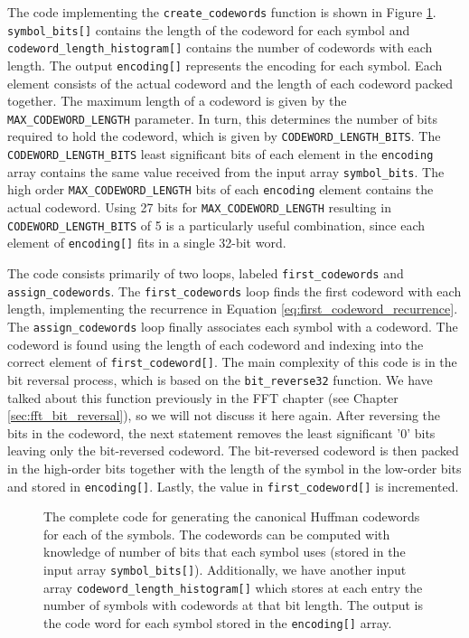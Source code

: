 The code implementing the \lstinline{create_codewords} function is shown in Figure \ref{fig:huffman_create_codeword.cpp}. \lstinline{symbol_bits[]} contains the length of the codeword for each symbol and \lstinline{codeword_length_histogram[]} contains the number of codewords with each length. The output \lstinline{encoding[]} represents the encoding for each symbol. Each element consists of the actual codeword and the length of each codeword packed together.  The maximum length of a codeword is given by the \lstinline{MAX_CODEWORD_LENGTH} parameter.  In turn, this determines the number of bits required to hold the codeword, which is given by  \lstinline{CODEWORD_LENGTH_BITS}. The \lstinline{CODEWORD_LENGTH_BITS} least significant bits of each element in the \lstinline{encoding} array contains the same value received from the input array \lstinline{symbol_bits}. The high order \lstinline{MAX_CODEWORD_LENGTH} bits of each \lstinline{encoding} element contains the actual codeword.  Using 27 bits for \lstinline{MAX_CODEWORD_LENGTH} resulting in \lstinline{CODEWORD_LENGTH_BITS} of 5 is a particularly useful combination, since each element of \lstinline{encoding[]} fits in a single 32-bit word.

The code consists primarily of two loops, labeled \lstinline{first_codewords} and \lstinline{assign_codewords}.  The \lstinline{first_codewords} loop finds the first codeword with each length, implementing the recurrence in Equation \ref{eq:first_codeword_recurrence}.   The \lstinline{assign_codewords} loop finally associates each symbol with a codeword.  The codeword is found using the length of each codeword and indexing into the correct element of \lstinline{first_codeword[]}.  The main complexity of this code is in the bit reversal process, which is based on the \lstinline{bit_reverse32} function. We have talked about this function previously in the FFT chapter (see Chapter \ref{sec:fft_bit_reversal}), so we will not discuss it here again. After reversing the bits in the codeword, the next statement removes the least significant '0' bits leaving only the bit-reversed codeword. The bit-reversed codeword is then packed in the high-order bits together with the length of the symbol in the low-order bits and stored in \lstinline{encoding[]}.  Lastly, the value in \lstinline{first_codeword[]} is incremented.

\begin{figure}

\caption{ The complete code for generating the canonical Huffman codewords for each of the symbols. The codewords can be computed with knowledge of number of bits that each symbol uses (stored in the input array \lstinline{symbol_bits[]}). Additionally, we have another input array \lstinline{codeword_length_histogram[]} which stores at each entry the number of symbols with codewords at that bit length. The output is the code word for each symbol stored in the \lstinline{encoding[]} array. }
\label{fig:huffman_create_codeword.cpp}
\end{figure}

